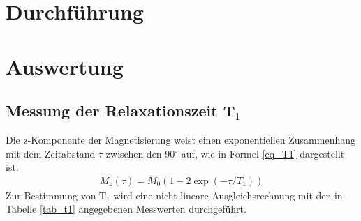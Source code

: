 \documentclass[]{scrartcl}
\begin{document}
\section{Durchführung}

\section{Auswertung}

\subsection{Messung der Relaxationszeit T$_1$}
Die z-Komponente der Magnetisierung weist einen exponentiellen Zusammenhang mit dem Zeitabstand $\tau$ zwischen den 90$^{\circ}$ auf, wie in Formel \ref{eq_T1} dargestellt ist. \\
\begin{align}
M_{z}(\tau)=M_0(1-2\exp(-\tau/T_1))
\label{eq_T1}
\end{align}
Zur Bestimmung von T$_1$ wird eine nicht-lineare Ausgleichsrechnung mit den in Tabelle \ref{tab_t1} angegebenen Messwerten durchgeführt. \\
\end{document}
